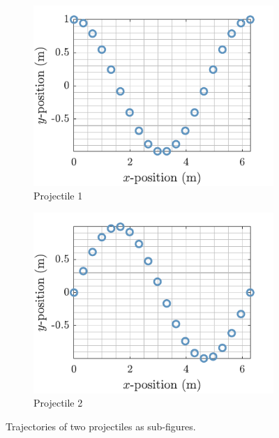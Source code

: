 \documentclass[draft,article]{UsydReport}
\begin{document}
\begin{figure}
    \centering
    \begin{subfigure}[t]{0.49\columnwidth}
    \centering
        \includegraphics[width=\linewidth]{Images/Cos.pdf}
        \caption{Projectile 1}
        \label{fig:Projectile1}
    \end{subfigure}\hfill
    \begin{subfigure}[t]{0.49\columnwidth}
    \centering
        \includegraphics[width=\linewidth]{Images/Sin.pdf}
        \caption{Projectile 2}
        \label{fig:Projectile2}
    \end{subfigure}
    \caption{Trajectories of two projectiles as sub-figures.}
    \label{fig:Subfigs}
\end{figure}
\end{document}
